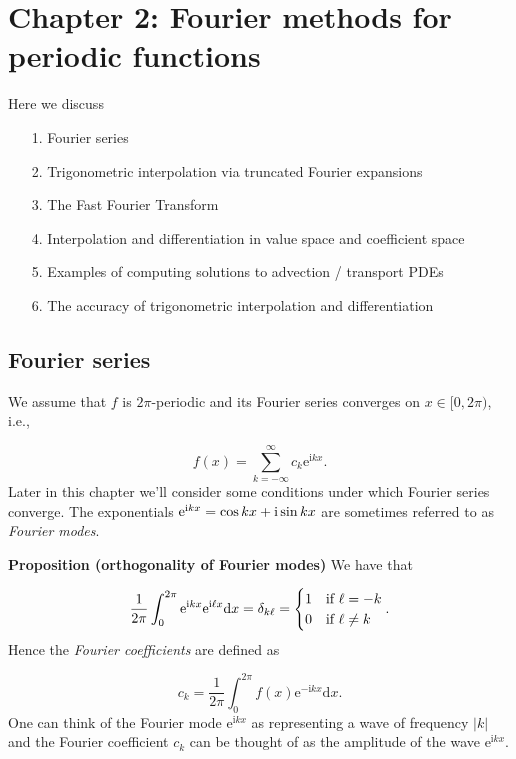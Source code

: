 \documentclass[12pt,a4paper]{article}
\begin{document}
\section{Chapter 2: Fourier methods for periodic functions}
Here we discuss

\begin{itemize}
\item[1. ] Fourier series


\item[2. ] Trigonometric interpolation via truncated Fourier expansions 


\item[3. ] The Fast Fourier Transform


\item[4. ] Interpolation and differentiation in value space and coefficient space


\item[5. ] Examples of computing solutions to advection / transport PDEs


\item[6. ] The accuracy of trigonometric interpolation and differentiation

\end{itemize}
\subsection{Fourier series}
We assume that $f$ is $2\pi$-periodic and its Fourier series converges on $x \in [0, 2\pi)$, i.e.,

\[
f(x) = \sum_{k=-\infty}^{\infty} c_k \mathrm{e}^{\mathrm{i} k x}.
\]
Later in this chapter we'll consider some conditions under which Fourier series converge. The exponentials $\mathrm{e}^{\mathrm{i} k x} = \cos kx + {\rm i} \sin kx$ are sometimes referred to as \emph{Fourier modes}.

\textbf{Proposition (orthogonality of Fourier modes)} We have that

\[
\frac{1}{2\pi}\int_{0}^{2\pi} \mathrm{e}^{\mathrm{i} k x} \mathrm{e}^{\mathrm{i} \ell x} {\rm d}x = \delta_{k\ell} = \begin{cases}
1 & \text{if } \ell = -k \\
0 & \text{if } \ell \neq k
\end{cases}.
\]
Hence the \emph{Fourier coefficients} are defined as

\[
c_k = \frac{1}{2\pi}\int_{0}^{2\pi} f(x) \mathrm{e}^{-\mathrm{i}k x} \mathrm{d} x.
\]
One can think of the Fourier mode $\mathrm{e}^{\mathrm{i} k x}$ as representing a wave of frequency $\vert k \vert$ and the Fourier coefficient $c_{k}$ can be thought of as the amplitude of the wave $\mathrm{e}^{\mathrm{i} k x}$.
\end{document}

